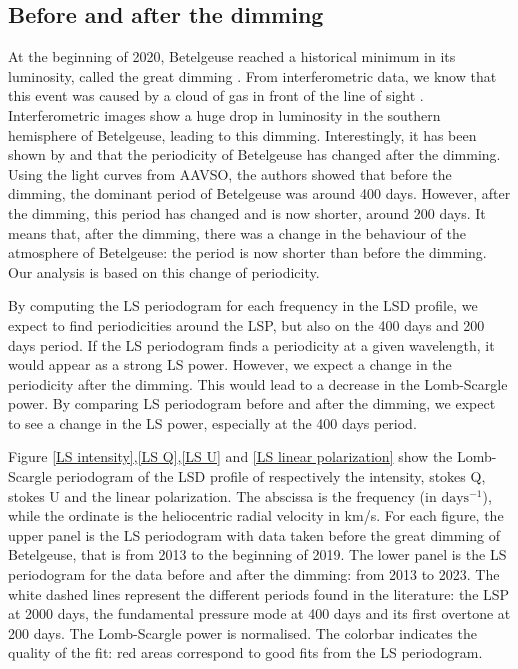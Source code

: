 \documentclass{aa}
\begin{document}
\subsection{Before and after the dimming}

At the beginning of 2020, Betelgeuse reached a historical minimum in its luminosity, called the great dimming \citep{guinan_fall_2020}. 
From interferometric data, we know that this event was caused by a cloud of gas in front of the line of sight \citep{montarges_dusty_2021}. 
Interferometric images show a huge drop in luminosity in the southern hemisphere of Betelgeuse, leading to this dimming. Interestingly, 
it has been shown by \cite{jadlovsky_analysis_2023} and \cite{dupree_great_2022} that the periodicity of Betelgeuse has changed after the dimming. Using the light curves from AAVSO, 
the authors showed that before the dimming, the dominant period of Betelgeuse was around 400 days. However, after the dimming, this period has changed and 
is now shorter, around 200 days. It means that, after the dimming, there was a change in the behaviour of the atmosphere of Betelgeuse: the period is now
shorter than before the dimming. Our analysis is based on this change of periodicity.

By computing the LS periodogram for each frequency 
in the LSD profile, we expect to find periodicities around the LSP, but also on the 400 days and 200 days period. If the LS periodogram finds a periodicity at a
given wavelength, it would appear as a strong LS power. However, we expect a change in the periodicity after the dimming. 
This would lead to a decrease in the Lomb-Scargle power. By comparing LS periodogram before and after the dimming, we expect to see a change in the LS power,
especially at the 400 days period. 

Figure \ref{LS intensity},\ref{LS Q},\ref{LS U} and \ref{LS linear polarization} show the Lomb-Scargle periodogram of the LSD profile of respectively 
the intensity, stokes Q, stokes U and the linear polarization. The abscissa is the frequency (in $\mathrm{days^{-1}}$), while the ordinate is the heliocentric radial velocity in km/s. 
For each figure, the upper panel is the LS periodogram with data taken before the great dimming of Betelgeuse, that is from 2013 to the beginning of 2019. 
The lower panel is the LS periodogram for the data before and after the dimming: from 2013 to 2023. The white dashed lines represent the different 
periods found in the literature: the LSP at 2000 days, the fundamental pressure mode at 400 days and its first overtone at 200 days. The Lomb-Scargle 
power is normalised. The colorbar indicates the quality of the fit: red areas correspond to good fits from the LS periodogram.
\end{document}
